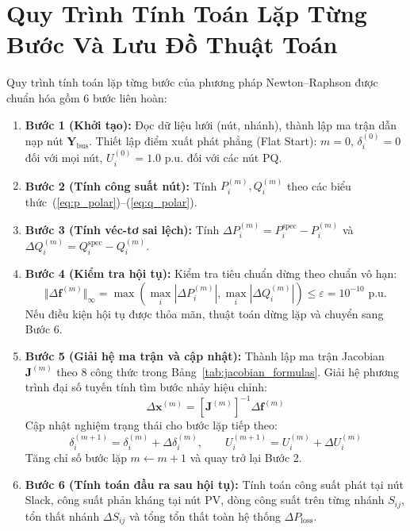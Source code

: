 \documentclass[12pt,a4paper,oneside]{report}
\begin{document}
\section{Quy Trình Tính Toán Lặp Từng Bước Và Lưu Đồ Thuật Toán}
Quy trình tính toán lặp từng bước của phương pháp Newton--Raphson được chuẩn hóa gồm 6 bước liên hoàn:
\begin{enumerate}
    \item \textbf{Bước 1 (Khởi tạo):} Đọc dữ liệu lưới (nút, nhánh), thành lập ma trận dẫn nạp nút $\mathbf{Y}_{\text{bus}}$. Thiết lập điểm xuất phát phẳng (Flat Start): $m = 0$, $\delta_i^{(0)} = 0$ đối với mọi nút, $U_i^{(0)} = 1.0\text{ p.u.}$ đối với các nút PQ.
    \item \textbf{Bước 2 (Tính công suất nút):} Tính $P_i^{(m)}, Q_i^{(m)}$ theo các biểu thức~(\ref{eq:p_polar})--(\ref{eq:q_polar}).
    \item \textbf{Bước 3 (Tính véc-tơ sai lệch):} Tính $\Delta P_i^{(m)} = P_i^{\text{spec}} - P_i^{(m)}$ và $\Delta Q_i^{(m)} = Q_i^{\text{spec}} - Q_i^{(m)}$.
    \item \textbf{Bước 4 (Kiểm tra hội tụ):} Kiểm tra tiêu chuẩn dừng theo chuẩn vô hạn:
    \begin{equation}
    \Vert \Delta \mathbf{f}^{(m)} \Vert_\infty = \max \left( \max_{i} |\Delta P_i^{(m)}|, \max_{i} |\Delta Q_i^{(m)}| \right) \le \varepsilon = 10^{-10}\text{ p.u.}
    \end{equation}
    Nếu điều kiện hội tụ được thỏa mãn, thuật toán dừng lặp và chuyển sang Bước 6.
    \item \textbf{Bước 5 (Giải hệ ma trận và cập nhật):} Thành lập ma trận Jacobian $\mathbf{J}^{(m)}$ theo 8 công thức trong Bảng~\ref{tab:jacobian_formulas}. Giải hệ phương trình đại số tuyến tính tìm bước nhảy hiệu chỉnh:
    \begin{equation}
    \Delta \mathbf{x}^{(m)} = [\mathbf{J}^{(m)}]^{-1} \Delta \mathbf{f}^{(m)}
    \end{equation}
    Cập nhật nghiệm trạng thái cho bước lặp tiếp theo:
    \begin{equation}
    \delta_i^{(m+1)} = \delta_i^{(m)} + \Delta \delta_i^{(m)}, \qquad U_i^{(m+1)} = U_i^{(m)} + \Delta U_i^{(m)}
    \end{equation}
    Tăng chỉ số bước lặp $m \leftarrow m + 1$ và quay trở lại Bước 2.
    \item \textbf{Bước 6 (Tính toán đầu ra sau hội tụ):} Tính toán công suất phát tại nút Slack, công suất phản kháng tại nút PV, dòng công suất trên từng nhánh $S_{ij}$, tổn thất nhánh $\Delta S_{ij}$ và tổng tổn thất toàn hệ thống $\Delta P_{\text{loss}}$.
\end{enumerate}
\end{document}
